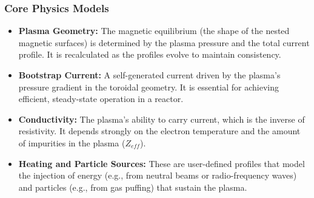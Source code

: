 \documentclass[10pt,aspectratio=169]{beamer}
\begin{document}
\begin{frame}
  \frametitle{Core Physics Models}
  \begin{itemize}
    \item \textbf{Plasma Geometry:} The magnetic equilibrium (the shape of the nested magnetic surfaces) is determined by the plasma pressure and the total current profile. It is recalculated as the profiles evolve to maintain consistency.
    \item \textbf{Bootstrap Current:} A self-generated current driven by the plasma's pressure gradient in the toroidal geometry. It is essential for achieving efficient, steady-state operation in a reactor.
    \item \textbf{Conductivity:} The plasma's ability to carry current, which is the inverse of resistivity. It depends strongly on the electron temperature and the amount of impurities in the plasma ($Z_{eff}$).
    \item \textbf{Heating and Particle Sources:} These are user-defined profiles that model the injection of energy (e.g., from neutral beams or radio-frequency waves) and particles (e.g., from gas puffing) that sustain the plasma.
  \end{itemize}
\end{frame}

\begin{frame}[allowframebreaks]
  
  
  \nocite{*}
\end{frame}
\end{document}

